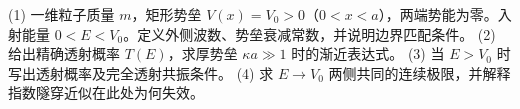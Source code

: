 (1) 一维粒子质量 \(m\)，矩形势垒 \(V(x)=V_0>0\)（\(0<x<a\)），两端势能为零。入射能量 \(0<E<V_0\)。定义外侧波数、势垒衰减常数，并说明边界匹配条件。
(2) 给出精确透射概率 \(T(E)\)，求厚势垒 \(\kappa a\gg1\) 时的渐近表达式。
(3) 当 \(E>V_0\) 时写出透射概率及完全透射共振条件。
(4) 求 \(E\to V_0\) 两侧共同的连续极限，并解释指数隧穿近似在此处为何失效。
